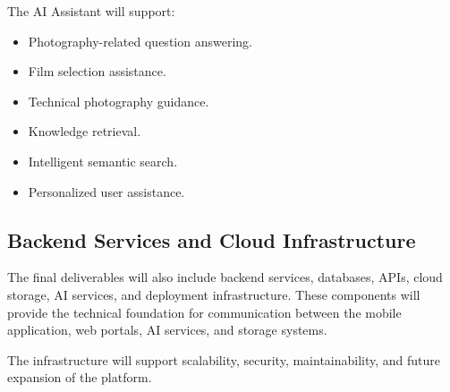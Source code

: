 The AI Assistant will support:

\begin{itemize}
    \item Photography-related question answering.
    \item Film selection assistance.
    \item Technical photography guidance.
    \item Knowledge retrieval.
    \item Intelligent semantic search.
    \item Personalized user assistance.
\end{itemize}

\subsection{Backend Services and Cloud Infrastructure}

The final deliverables will also include backend services, databases, APIs, cloud storage, AI services, and deployment infrastructure. These components will provide the technical foundation for communication between the mobile application, web portals, AI services, and storage systems.

The infrastructure will support scalability, security, maintainability, and future expansion of the platform.